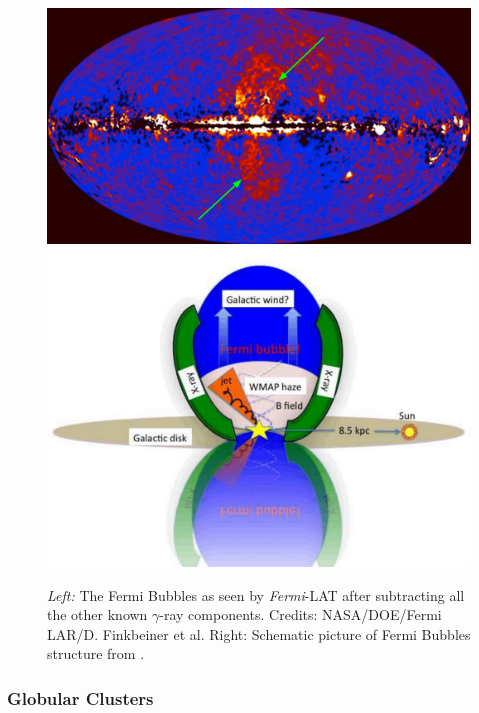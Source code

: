 \documentclass[main.tex]{subfiles}
\begin{document}
\begin{figure}[!htb]
\includegraphics[width=\linewidth]{Pictures/fermi_bubb_arrows.pdf}
\endminipage\hfill
{}
\includegraphics[width=\linewidth]{Pictures/diagramfbubbles.pdf}
\endminipage\hfill
\caption{\label{fig:fbubbles} \textit{Left:} The Fermi Bubbles as seen by \textit{Fermi}-LAT after subtracting all the other known $\gamma$-ray components. Credits: NASA/DOE/Fermi LAR/D. Finkbeiner et al. Right: Schematic picture of Fermi Bubbles structure from \cite{2010Afbubblesdiscovery}.}
\end{figure}

\subsubsection{Globular Clusters}
\end{document}
